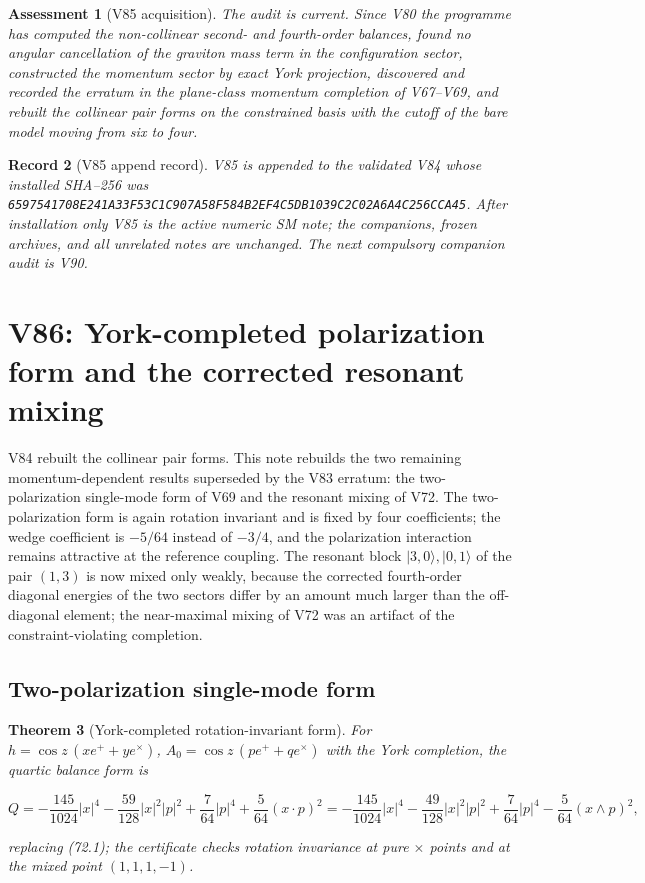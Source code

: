 \documentclass[11pt]{article}
\newtheorem{theorem}{Theorem}[section]
\newtheorem{assessment}[theorem]{Assessment}
\newtheorem{record}[theorem]{Record}
\theoremstyle{remark}
\begin{document}
\begin{assessment}[V85 acquisition]
\label{ass:v19v85}
The audit is current.  Since V80 the programme has computed the
non-collinear second- and fourth-order balances, found no angular
cancellation of the graviton mass term in the configuration sector,
constructed the momentum sector by exact York projection, discovered
and recorded the erratum in the plane-class momentum completion of
V67--V69, and rebuilt the collinear pair forms on the constrained
basis with the cutoff of the bare model moving from six to four.
\end{assessment}

\begin{record}[V85 append record]
\label{rec:v19v85}
V85 is appended to the validated V84 whose installed SHA--256 was
\texttt{6597541708E241A33F53C1C907A58F584B2EF4C5DB1039C2C02A6A4C256CCA45}.
After installation only V85 is the active numeric SM note; the
companions, frozen archives, and all unrelated notes are unchanged.  The
next compulsory companion audit is V90.
\end{record}


\section{V86: York-completed polarization form and the corrected resonant mixing}
\label{sec:v19v86}

V84 rebuilt the collinear pair forms.  This note rebuilds the two
remaining momentum-dependent results superseded by the V83 erratum:
the two-polarization single-mode form of V69 and the resonant mixing
of V72.  The two-polarization form is again rotation invariant and is
fixed by four coefficients; the wedge coefficient is \(-5/64\) instead
of \(-3/4\), and the polarization interaction remains attractive at
the reference coupling.  The resonant block \(|3,0\rangle,|0,1\rangle\)
of the pair \((1,3)\) is now mixed only weakly, because the corrected
fourth-order diagonal energies of the two sectors differ by an amount
much larger than the off-diagonal element; the near-maximal mixing of
V72 was an artifact of the constraint-violating completion.

\subsection{Two-polarization single-mode form}

\begin{theorem}[York-completed rotation-invariant form]
\label{thm:v19v86-form}
For \(h=\cos z\,(xe^++ye^\times)\), \(A_0=\cos z\,(pe^++qe^\times)\) with
the York completion, the quartic balance form is

\[
 Q=-\frac{145}{1024}|x|^4-\frac{59}{128}|x|^2|p|^2+\frac{7}{64}|p|^4+\frac{5}{64}(x\cdot p)^2
 =-\frac{145}{1024}|x|^4-\frac{49}{128}|x|^2|p|^2+\frac{7}{64}|p|^4-\frac{5}{64}(x\wedge p)^2,
                                                                    \tag{89.1}
\]

replacing (72.1); the certificate checks rotation invariance at pure
\(\times\) points and at the mixed point \((1,1,1,-1)\).
\end{theorem}
\end{document}
